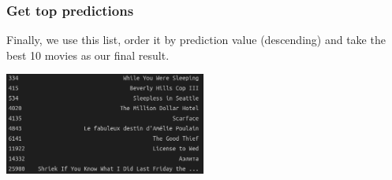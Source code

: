 \subsubsection*{Get top predictions}
Finally, we use this list, order it by prediction value (descending) and take the best 10 movies as our final result.
\begin{center}
    \captionsetup{type=figure}
    \includegraphics[width=250px]{images/svd-top.png}
\end{center}